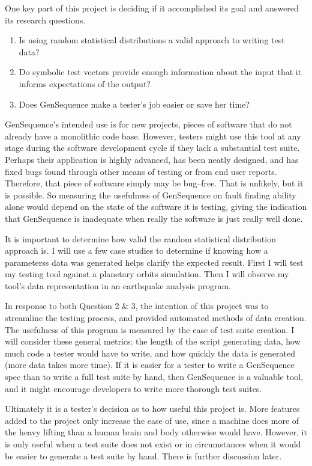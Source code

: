 
One key part of this project is deciding if it accomplished its goal and answered its research questions. 
\begin{enumerate}
\item Is using random statistical distributions a valid approach to writing test data?
\item Do symbolic test vectors provide enough information about the input that it informs expectations of the output?
\item Does GenSequence make a tester's job easier or save her time?
\end{enumerate}

GenSequence's intended use is for new projects, pieces of software that do not already have a monolithic code base. However, testers might use this tool at any stage during the software development cycle if they lack a substantial test suite. Perhaps their application is highly advanced, has been neatly designed, and has fixed bugs found through other means of testing or from end user reports. Therefore, that piece of software simply may be bug--free. That is unlikely, but it is possible. So measuring the usefulness of GenSequence on fault finding ability alone would depend on the state of the software it is testing, giving the indication that GenSequence is inadequate when really the software is just really well done.

It is important to determine how valid the random statistical distribution approach is. I will use a few case studies to determine if knowing how a parameterss data was generated helps clarify the expected result. First I will test my testing tool against a planetary orbits simulation. Then I will observe my tool's data representation in an earthquake analysis program. 

In response to both Question 2 \& 3, the intention of this project was to streamline the testing process, and provided automated methods of data creation. The usefulness of this program is measured by the ease of test suite creation. I will consider these general metrics: the length of the script generating data, how much code a tester would have to write, and how quickly the data is generated (more data takes more time). If it is easier for a tester to write a GenSequence spec than to write a full test suite by hand, then GenSequence is a valuable tool, and it might encourage developers to write more thorough test suites.

Ultimately it is a tester's decision as to how useful this project is. More features added to the project only increase the ease of use, since a machine does more of the heavy lifting than a human brain and body otherwise would have. However, it is only useful when a test suite does not exist or in circumstances when it would be easier to generate a test suite by hand. There is further discussion later.